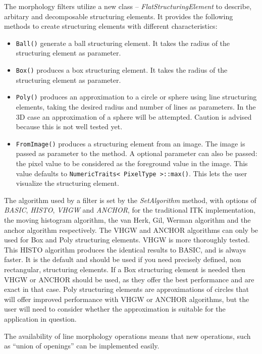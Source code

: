 \documentclass{InsightArticle}
\begin{document}
The morphology filters utilize a new class -- {\em
FlatStructuringElement} to describe, arbitary and decomposable
structuring elements. It provides the following methods to create
structuring elements with different characteristics:
\begin{itemize}
  \item \verb$Ball()$ generate a ball structuring element. It takes the 
	radius of the structuring element as parameter.
  \item \verb$Box()$ produces a box structuring element. It takes the radius 
	of the structuring element as parameter.
  \item \verb$Poly()$ produces an approximation to a circle or sphere using 
	line structuring elements, taking the desired radius and number of 
	lines as parameters. In the 3D case an approximation of a sphere will 
	be attempted. Caution is advised because this is not well tested yet.
  \item \verb$FromImage()$ produces a structuring element from an image. The image is passed
as parameter to the method. A optional parameter can also be passed: the pixel value
to be considered as the foreground value in the image. This value defaults to
\verb$NumericTraits< PixelType >::max()$. This lets the user visualize the structuring element.
\end{itemize}

The algorithm used by a filter is set by the {\em SetAlgorithm}
method, with options of {\em BASIC}, {\em HISTO}, {\em VHGW} and {\em
ANCHOR}, for the traditional ITK implementation, the moving histogram
algorithm, the van Herk, Gil, Werman algorithm and the anchor
algorithm respectively. The VHGW and ANCHOR algorithms can only be
used for Box and Poly structuring elements. VHGW is more thoroughly
tested. This HISTO algorithm produces the identical results to BASIC,
and is always faster. It is the default and should be used if you need
precisely defined, non rectangular, structuring elements. If a Box
structuring element is needed then VHGW or ANCHOR should be used, as
they offer the best performance and are exact in that case. Poly
structuring elements are approximations of circles that will offer
improved performance with VHGW or ANCHOR algorithms, but the user will
need to consider whether the approximation is suitable for the
application in question.

The availability of line morphology operations means that new
operations, such as ``union of openings'' can be implemented easily.
\end{document}
